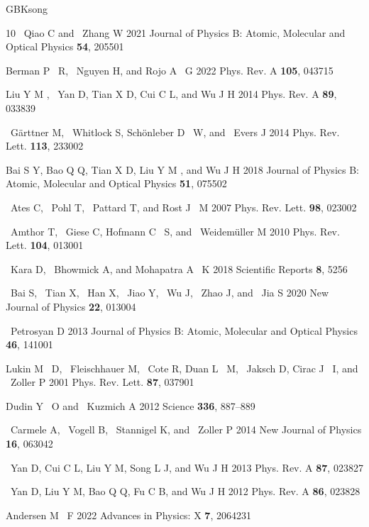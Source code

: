 \documentclass{cpbtex}
\begin{document}
\begin{CJK*}{GBK}{song}
\begin{thebibliography}{10}
~Qiao C and ~Zhang W 2021 {{Journal
  of Physics B: Atomic, Molecular and Optical Physics}} \textbf{54}, 205501

Berman P ~R, ~Nguyen H, and Rojo A ~G 2022 {{Phys. Rev. A}} \textbf{105}, 043715 

Liu Y M , ~Yan D, Tian X D, Cui C L, and Wu J H 2014 {{Phys. Rev. A}} \textbf{89}, 033839

~G\"arttner M, ~Whitlock S, Sch\"onleber D ~W, and ~Evers J 2014 {{Phys. Rev. Lett.}} \textbf{113}, 233002

Bai S Y, Bao Q Q, Tian X D, Liu Y M , and Wu J H 2018
  {{Journal of Physics B: Atomic, Molecular and Optical
  Physics}} \textbf{51}, 075502

~Ates C, ~Pohl T, ~Pattard T, and  Rost J ~M 2007 {{Phys. Rev. Lett.}} \textbf{98}, 023002

~Amthor T, ~Giese C, Hofmann C ~S, and ~Weidem\"uller M 2010 {{Phys. Rev.
  Lett.}} \textbf{104}, 013001

~Kara D, ~Bhowmick A, and Mohapatra A ~K 2018 {{Scientific Reports}} \textbf{8}, 5256 

~Bai S, ~Tian X, ~Han X, ~Jiao Y, ~Wu J, ~Zhao J, and ~Jia S 2020 {{New Journal of Physics}}
  \textbf{22}, 013004 

~Petrosyan D 2013 {{Journal of Physics B:
  Atomic, Molecular and Optical Physics}} \textbf{46}, 141001 

Lukin M ~D,  ~Fleischhauer M, ~Cote R, Duan L ~M, ~Jaksch D, Cirac J ~I, and
  ~Zoller P 2001 {{Phys. Rev. Lett.}}
  \textbf{87}, 037901

Dudin Y ~O and ~Kuzmich A 2012 {{Science}} \textbf{336},
  887--889 

~Carmele A, ~Vogell B, ~Stannigel K, and ~Zoller P 2014 {{New Journal of Physics}} \textbf{16}, 063042

~Yan D, Cui C L, Liu Y M, Song  L J, and Wu J H 2013 {{Phys. Rev. A}}
  \textbf{87}, 023827

~Yan D, Liu Y M, Bao Q Q, Fu C B, and Wu J H 2012 {{Phys. Rev. A}}
  \textbf{86}, 023828

Andersen M ~F 2022 {{Advances in Physics: X}} \textbf{7}, 2064231


\end{thebibliography}
\end{CJK*}
\end{document}
